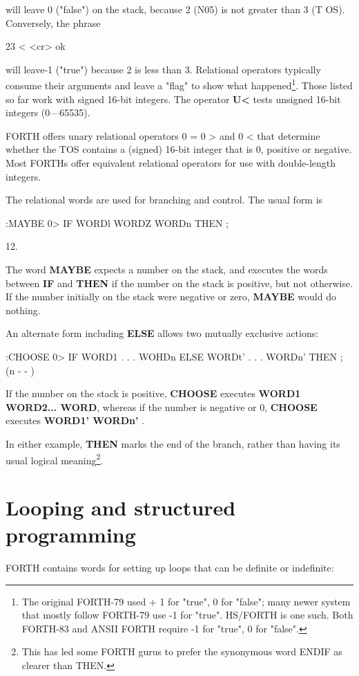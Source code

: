 will leave 0 ("false") on the stack, because 2 (N05) is not greater
than 3 (T OS). Conversely, the phrase

23 < <cr> ok

will leave-1 ("true") because 2 is less than 3. Relational operators typically consume their arguments and leave a "ﬂag" to show what happened\footnote{ The original FORTH-79 used + 1 for "true", 0 for "false"; many newer system that mostly follow FORTH-79 use -1 for "true". HS/FORTH is one such. Both FORTH-83 and ANSII FORTH require -1 for "true", 0 for "false".}. Those listed so far work with signed 16-bit integers. The operator \textbf{U<} tests unsigned 16-bit integers (0—65535).

FORTH offers unary relational operators 0 = 0 > and 0 < that determine whether the TOS contains a (signed) 16-bit integer that is 0, positive or negative. Most FORTHs offer equivalent relational operators for use with double-length integers.

The relational words are used for branching and control. The usual form is

:MAYBE 0> IF WORDl WORDZ
WORDn THEN ;

12.

The word \textbf{MAYBE} expects a number on the stack, and executes the words between \textbf{IF} and \textbf{THEN} if the number on the stack is positive, but not otherwise. If the number initially on the stack were negative or zero, \textbf{MAYBE} would do nothing.

An alternate form including \textbf{ELSE} allows two mutually exclusive actions:

:CHOOSE 0> IF WORD1 . . . WOHDn
ELSE WORDt' . . . WORDn'
THEN ; (n - - )

If the number on the stack is positive, \textbf{CHOOSE} executes \textbf{WORD1 WORD2... WORD}, whereas if the number is negative or 0, \textbf{CHOOSE} executes \textbf{WORD1' WORDn'} .

In either example, \textbf{THEN} marks the end of the branch, rather than having its usual logical meaning\footnote{This has led some FORTH gurus to prefer the synonymous word ENDIF as clearer than THEN.}.

\section{Looping and structured programming}

FORTH contains words for setting up loops that can be definite or indefinite:

